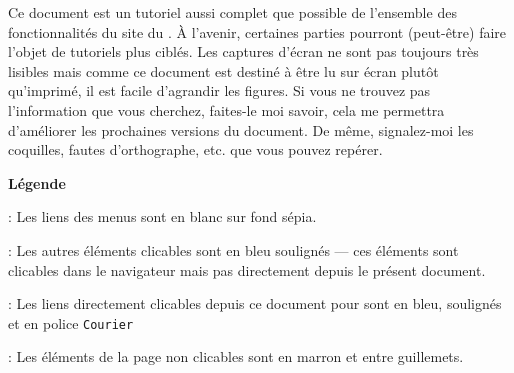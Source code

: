 
\thispagestyle{empty}
\begin{tcolorbox}[colframe=Bittersweet!50!black,title=À propos de ce document]
    Ce document est un tutoriel aussi complet que possible de l’ensemble des fonctionnalités du site \CF{} du \CdS.  À l'avenir, certaines parties pourront (peut-être) faire l'objet de tutoriels plus ciblés.
    \aster
    Les captures d'écran ne sont pas toujours très lisibles mais comme ce document est destiné à être lu sur écran plutôt qu'imprimé, il est facile d'agrandir les figures.
    \aster
    Si vous ne trouvez pas l’information que vous cherchez, faites-le moi savoir, cela me permettra d’améliorer les prochaines versions du document. De même, signalez-moi les coquilles, fautes d'orthographe, etc. que vous pouvez repérer.
\end{tcolorbox}

\vfill

\noindent
{\Large\textbf{Légende}}

\medskip
\noindent
{}: Les liens des menus sont en blanc sur fond sépia.

\noindent
{}: Les autres éléments clicables sont en bleu soulignés --- ces éléments sont clicables dans le navigateur mais pas directement depuis le présent document.

\noindent
{}: Les liens directement clicables depuis ce document pour sont en bleu, soulignés et en police \texttt{Courier}

\noindent
{}: Les éléments de la page non clicables sont en marron et entre guillemets.


